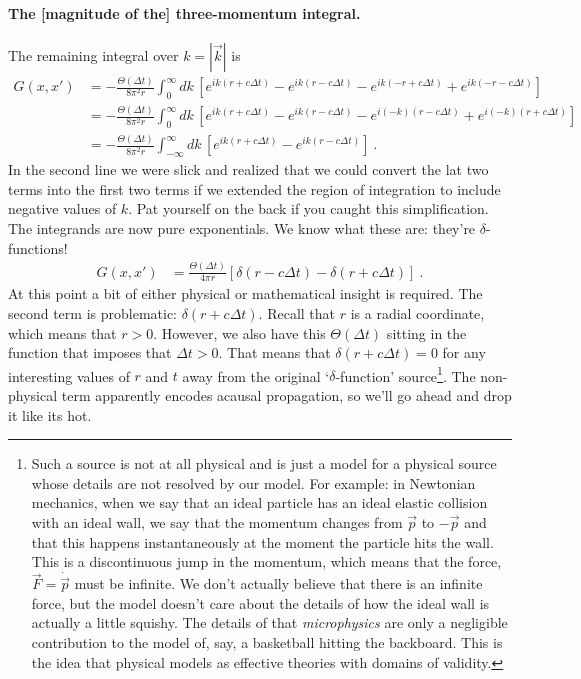 \paragraph{The [magnitude of the] three-momentum integral.} The remaining integral over $k=|\vec k|$ is
\begin{align}
	G(x,x')&= -
	\frac{\Theta(\Delta t)}{8\pi^2 r} 
	\int^\infty_0
	dk\, 
	\left[
 		e^{ik(r+c\Delta t)}
 		- e^{ik(r-c\Delta t)}
 		- e^{ik(-r+c\Delta t)}
 		+ e^{ik(-r-c\Delta t)}
	\right] 
	\\
	&= -
	\frac{\Theta(\Delta t)}{8\pi^2 r} 
	\int^\infty_0
	dk\, 
	\left[
 		e^{ik(r+c\Delta t)}
 		- e^{ik(r-c\Delta t)}
 		- e^{i(-k)(r-c\Delta t)}
 		+ e^{i(-k)(r+c\Delta t)}
	\right] 
	\\
	&= -
	\frac{\Theta(\Delta t)}{8\pi^2 r} 
	\int^\infty_{-\infty}
	dk\, 
	\left[
 		e^{ik(r+c\Delta t)}
 		- e^{ik(r-c\Delta t)}
	\right] 
	\ .
\end{align}
In the second line we were slick and realized that we could convert the lat two terms into the first two terms if we extended the region of integration to include negative values of $k$. Pat yourself on the back if you caught this simplification. The integrands are now pure exponentials. We know what these are: they're $\delta$-functions!
\begin{align}
	G(x,x')
	&=
	\frac{\Theta(\Delta t)}{4\pi r} 
	\left[ \delta(r-c\Delta t) - \delta(r+c\Delta t) \right]
	\ .
\end{align}
At this point a bit of either physical or mathematical insight is required. The second term is problematic: $\delta(r+c\Delta t)$. Recall that $r$ is a radial coordinate, which means that $r>0$. However, we also have this $\Theta(\Delta t)$ sitting in the function that imposes that $\Delta t > 0$. That means that $\delta(r+c\Delta t) = 0$ for any interesting values of $r$ and $t$ away from the original `$\delta$-function' source\footnote{Such a source is not at all physical and is just a model for a physical source whose details are not resolved by our model. For example: in Newtonian mechanics, when we say that an ideal particle has an ideal elastic collision with an ideal wall, we say that the momentum changes from $\vec{p}$ to $-\vec{p}$ and that this happens instantaneously at the moment the particle hits the wall. This is a discontinuous jump in the momentum, which means that the force, $\vec{F} = \dot{\vec{p}}$ must be infinite. We don't actually believe that there is an infinite force, but the model doesn't care about the details of how the ideal wall is actually a little squishy. The details of that \emph{microphysics} are only a negligible contribution to the model of, say, a basketball hitting the backboard. This is the idea that physical models as effective theories with domains of validity.}. The non-physical term apparently encodes acausal propagation, so we'll go ahead and drop it like its hot.


